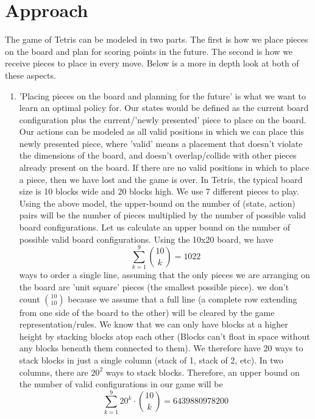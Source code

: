 \documentclass{article}
\begin{document}
\section{Approach}
The game of Tetris can be modeled in two parts. The first is how we place pieces on the board and plan for scoring points in the future. The second is how we receive pieces to place in every move. Below is a more in depth look at both of these aspects.
\begin{enumerate}
    \item 'Placing pieces on the board and planning for the future' is what we want to learn an optimal policy for. Our states would be defined as the current board configuration plus the current/'newly presented' piece to place on the board. Our actions can be modeled as all valid positions in which we can place this newly presented piece, where 'valid' means a placement that doesn't violate the dimensions of the board, and doesn't overlap/collide with other pieces already present on the board. If there are no valid positions in which to place a piece, then we have lost and the game is over. In Tetris, the typical board size is 10 blocks wide and 20 blocks high. We use 7 different pieces to play. Using the above model, the upper-bound on the number of (state, action) pairs will be the number of pieces multiplied by the number of possible valid board configurations. Let us calculate an upper bound on the number of possible valid board configurations. Using the 10x20 board, we have
    $$\sum_{k=1}^{9}\binom{10}{k} = 1022$$
    ways to order a single line, assuming that the only pieces we are arranging on the board are 'unit square' pieces (the smallest possible piece). we don't count $\binom{10}{10}$ because we assume that a full line (a complete row extending from one side of the board to the other) will be cleared by the game representation/rules. We know that we can only have blocks at a higher height by stacking blocks atop each other (Blocks can't float in space without any blocks beneath them connected to them). We therefore have 20 ways to stack blocks in just a single column (stack of 1, stack of 2, etc). In two columns, there are $20^2$ ways to stack blocks. Therefore, an upper bound on the number of valid configurations in our game will be
    $$\sum_{k=1}^{9}20^k\cdot\binom{10}{k} = 6439880978200$$

\end{enumerate}
\end{document}
